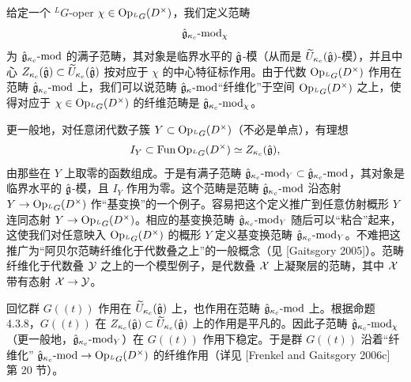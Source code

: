 给定一个 ${}^L G$-oper $\chi\in\operatorname{Op}_{{}^L G}(D^\times)$，我们定义范畴
\[
    \hat{\mathfrak{g}}_{\kappa_c}\text{-}\mathrm{mod}_\chi
\]
为 $\hat{\mathfrak{g}}_{\kappa_c}\text{-}\mathrm{mod}$ 的满子范畴，其对象是临界水平的 $\hat{\mathfrak{g}}$-模（从而是 $\widetilde{U}_{\kappa_c}(\hat{\mathfrak{g}})$-模），并且中心 $Z_{\kappa_c}(\hat{\mathfrak{g}})\subset\widetilde{U}_{\kappa_c}(\hat{\mathfrak{g}})$ 按对应于 $\chi$ 的中心特征标作用。由于代数 $\operatorname{Op}_{{}^L G}(D^\times)$ 作用在范畴 $\hat{\mathfrak{g}}_{\kappa_c}\text{-}\mathrm{mod}$ 上，我们可以说范畴 $\hat{\mathfrak{g}}_\kappa\text{-}\mathrm{mod}$“纤维化”于空间 $\operatorname{Op}_{{}^L G}(D^\times)$ 之上，使得对应于 $\chi\in\operatorname{Op}_{{}^L G}(D^\times)$ 的纤维范畴是 $\hat{\mathfrak{g}}_{\kappa_c}\text{-}\mathrm{mod}_\chi$。

更一般地，对任意闭代数子簇 $Y\subset\operatorname{Op}_{{}^L G}(D^\times)$（不必是单点），有理想
\[
    I_Y\subset\operatorname{Fun}\operatorname{Op}_{{}^L G}(D^\times)\simeq Z_{\kappa_c}(\hat{\mathfrak{g}}),
\]
由那些在 $Y$ 上取零的函数组成。于是有满子范畴 $\hat{\mathfrak{g}}_{\kappa_c}\text{-}\mathrm{mod}_Y\subset\hat{\mathfrak{g}}_{\kappa_c}\text{-}\mathrm{mod}$，其对象是临界水平的 $\hat{\mathfrak{g}}$-模，且 $I_Y$ 作用为零。这个范畴是范畴 $\hat{\mathfrak{g}}_{\kappa_c}\text{-}\mathrm{mod}$ 沿态射 $Y\to\operatorname{Op}_{{}^L G}(D^\times)$ 作“基变换”的一个例子。容易把这个定义推广到任意仿射概形 $Y$ 连同态射 $Y\to\operatorname{Op}_{{}^L G}(D^\times)$。相应的基变换范畴 $\hat{\mathfrak{g}}_{\kappa_c}\text{-}\mathrm{mod}_Y$ 随后可以“粘合”起来，这使我们对任意映入 $\operatorname{Op}_{{}^L G}(D^\times)$ 的概形 $Y$ 定义基变换范畴 $\hat{\mathfrak{g}}_{\kappa_c}\text{-}\mathrm{mod}_Y$。不难把这推广为“阿贝尔范畴纤维化于代数叠之上”的一般概念（见 [Gaitsgory 2005]）。范畴纤维化于代数叠 $\mathcal{Y}$ 之上的一个模型例子，是代数叠 $\mathcal{X}$ 上凝聚层的范畴，其中 $\mathcal{X}$ 带有态射 $\mathcal{X}\to\mathcal{Y}$。

回忆群 $G((t))$ 作用在 $\widetilde{U}_{\kappa_c}(\hat{\mathfrak{g}})$ 上，也作用在范畴 $\hat{\mathfrak{g}}_{\kappa_c}\text{-}\mathrm{mod}$ 上。根据命题 4.3.8，$G((t))$ 在 $Z_{\kappa_c}(\hat{\mathfrak{g}})\subset\widetilde{U}_{\kappa_c}(\hat{\mathfrak{g}})$ 上的作用是平凡的。因此子范畴 $\hat{\mathfrak{g}}_{\kappa_c}\text{-}\mathrm{mod}_\chi$（更一般地，$\hat{\mathfrak{g}}_{\kappa_c}\text{-}\mathrm{mod}_Y$）在 $G((t))$ 作用下稳定。于是群 $G((t))$ 沿着“纤维化” $\hat{\mathfrak{g}}_{\kappa_c}\text{-}\mathrm{mod}\to\operatorname{Op}_{{}^L G}(D^\times)$ 的纤维作用（详见 [Frenkel and Gaitsgory 2006c] 第 20 节）。

